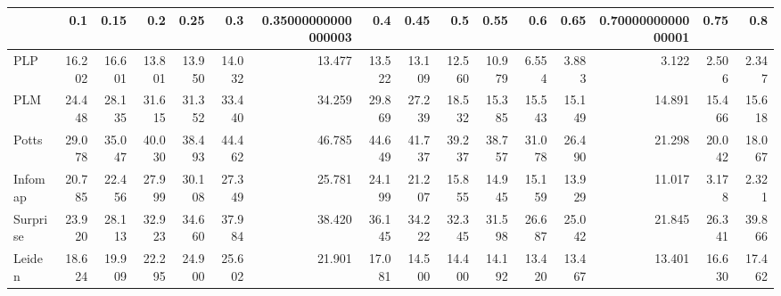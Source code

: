 \begin{tabular}{lrrrrrrrrrrrrrrr}
\toprule
{} &    0.1 &   0.15 &    0.2 &   0.25 &    0.3 & 0.35000000000000003 &    0.4 &   0.45 &    0.5 &   0.55 &    0.6 &   0.65 & 0.7000000000000001 &   0.75 &    0.8 \\
\midrule
PLP      & 16.202 & 16.601 & 13.801 & 13.950 & 14.032 &              13.477 & 13.522 & 13.109 & 12.560 & 10.979 &  6.554 &  3.883 &              3.122 &  2.506 &  2.347 \\
PLM      & 24.448 & 28.135 & 31.615 & 31.352 & 33.440 &              34.259 & 29.869 & 27.239 & 18.532 & 15.385 & 15.543 & 15.149 &             14.891 & 15.466 & 15.618 \\
Potts    & 29.078 & 35.047 & 40.030 & 38.493 & 44.462 &              46.785 & 44.649 & 41.737 & 39.237 & 38.757 & 31.078 & 26.490 &             21.298 & 20.042 & 18.067 \\
Infomap  & 20.785 & 22.456 & 27.999 & 30.108 & 27.349 &              25.781 & 24.199 & 21.207 & 15.855 & 14.945 & 15.159 & 13.929 &             11.017 &  3.178 &  2.321 \\
Surprise & 23.920 & 28.113 & 32.923 & 34.660 & 37.984 &              38.420 & 36.145 & 34.222 & 32.345 & 31.598 & 26.687 & 25.042 &             21.845 & 26.341 & 39.866 \\
Leiden   & 18.624 & 19.909 & 22.295 & 24.900 & 25.602 &              21.901 & 17.081 & 14.500 & 14.400 & 14.192 & 13.420 & 13.467 &             13.401 & 16.630 & 17.462 \\
\bottomrule
\end{tabular}
